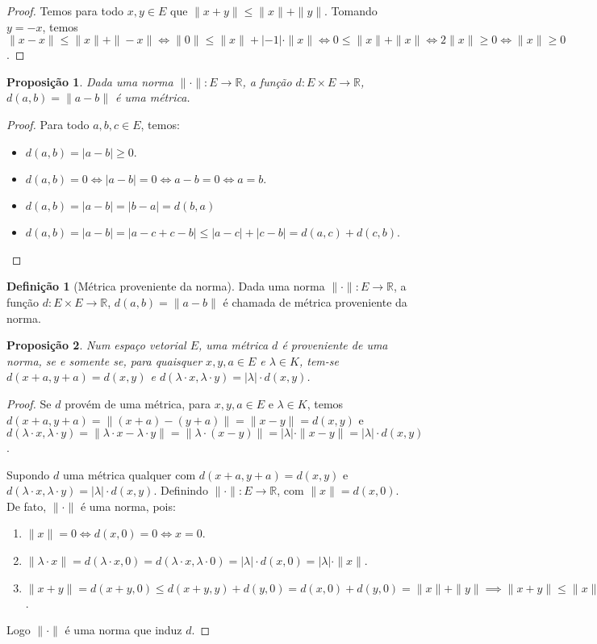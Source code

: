 \documentclass{article}
\theoremstyle{plain}
\newtheorem{prop}{Proposição}[section]
\theoremstyle{definition}
\newtheorem{definicao}{Definição}[section]
\theoremstyle{remark}
\begin{document}
\begin{proof}
	Temos para todo $x,y \in E$ que $\| x+y\| \leq \|x \| + \| y \|$.  Tomando $y = - x$, temos $\| x-x\| \leq \| x\| + \| -x\| \iff \|0 \| \leq \|x\| + |-1| \cdot \| x\| \iff 0 \leq \|x\| + \|x\| \iff 2\|x\| \geq 0 \iff \|x\| \geq 0$.
\end{proof}
\begin{prop}
	Dada uma norma $\| \cdot \|: E \to \mathbb{R}$, a função $d: E\times E \to \mathbb{R}$, $d(a,b) = \| a-b\|$ é uma métrica.
\end{prop}
\begin{proof}
	Para todo $a,b,c\in E$, temos:
	\begin{itemize}
		\item $d(a,b) = |a-b| \geq 0 $.
		\item $d(a,b) = 0 \iff |a-b| = 0 \iff a-b = 0 \iff a = b.$
		\item $d(a,b) = |a-b| = |b-a| = d(b,a)$
		\item $d(a,b) =  |a-b|  = |a-c+c-b| \leq |a-c| + |c-b| = d(a,c) + d(c,b)$.
	\end{itemize}
\end{proof}
\begin{definicao}[Métrica proveniente da norma]
	Dada uma norma $\| \cdot \|: E \to \mathbb{R}$, a função $d: E\times E \to \mathbb{R}$, $d(a,b) = \| a-b\|$ é chamada de métrica proveniente da norma.
\end{definicao}
\begin{prop}
	Num espaço vetorial $E$, uma métrica $d$ é proveniente de uma norma, se e somente se,  para quaisquer $x,y,a\in E$ e $\lambda\in K$, tem-se $d(x+a, y+a) = d(x,y)$ e $d(\lambda \cdot x, \lambda \cdot y ) = |\lambda| \cdot d(x,y)$.
\end{prop}
\begin{proof}
	Se $d$ provém de uma métrica, para $x,y, a\in E$ e $\lambda \in K$, temos  $d(x+a,y+a) = \|(x+a) -(y+a) \| = \| x- y\| = d(x,y)$ e $d(\lambda \cdot x, \lambda \cdot y ) = \| \lambda\cdot x  - \lambda \cdot y \| = \| \lambda\cdot (x-y) \| = |\lambda|\cdot \| x-y\| = |\lambda | \cdot d(x,y)$.

	Supondo $d$ uma métrica qualquer com $d(x+a, y+a) = d(x,y)$ e $d(\lambda \cdot x, \lambda \cdot y ) = |\lambda| \cdot d(x,y)$. Definindo $\| \cdot \| : E \to \mathbb{R}$, com $\|x\| = d(x,0)$. De fato, $\| \cdot \| $ é uma norma, pois:
	\begin{enumerate}
		\item $\| x\| = 0 \iff d(x,0) = 0 \iff x =0$.
		\item $\| \lambda \cdot x \| = d(\lambda \cdot x, 0) = d(\lambda \cdot x, \lambda \cdot 0) = |\lambda |\cdot d(x,0) = |\lambda|\cdot \| x\|$.
		\item $\| x+y\| = d(x+y,0) \leq d(x+y, y) + d(y , 0) = d(x,0) + d(y,0) = \| x\| + \|y\| \implies \| x+y \| \leq \|x\| +   \|y\|$.
	\end{enumerate}
	Logo $\|\cdot \|$ é uma norma que induz $d$.
\end{proof}
\end{document}
